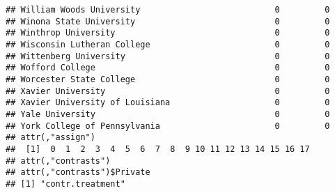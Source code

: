 \documentclass[
]{article}
\newenvironment{Shaded}{\begin{snugshade}}{\end{snugshade}}
\newcommand{\CommentTok}[1]{\textcolor[rgb]{0.56,0.35,0.01}{\textit{#1}}}
\newcommand{\DataTypeTok}[1]{\textcolor[rgb]{0.13,0.29,0.53}{#1}}
\newcommand{\DecValTok}[1]{\textcolor[rgb]{0.00,0.00,0.81}{#1}}
\newcommand{\FloatTok}[1]{\textcolor[rgb]{0.00,0.00,0.81}{#1}}
\newcommand{\KeywordTok}[1]{\textcolor[rgb]{0.13,0.29,0.53}{\textbf{#1}}}
\newcommand{\NormalTok}[1]{#1}
\newcommand{\OperatorTok}[1]{\textcolor[rgb]{0.81,0.36,0.00}{\textbf{#1}}}
\newcommand{\OtherTok}[1]{\textcolor[rgb]{0.56,0.35,0.01}{#1}}
\newcommand{\StringTok}[1]{\textcolor[rgb]{0.31,0.60,0.02}{#1}}
\begin{document}
\begin{verbatim}
## William Woods University                           0         0
## Winona State University                            0         0
## Winthrop University                                0         0
## Wisconsin Lutheran College                         0         0
## Wittenberg University                              0         0
## Wofford College                                    0         0
## Worcester State College                            0         0
## Xavier University                                  0         0
## Xavier University of Louisiana                     0         0
## Yale University                                    0         0
## York College of Pennsylvania                       0         0
## attr(,"assign")
##  [1]  0  1  2  3  4  5  6  7  8  9 10 11 12 13 14 15 16 17
## attr(,"contrasts")
## attr(,"contrasts")$Private
## [1] "contr.treatment"
\end{verbatim}

\begin{Shaded}
\end{Shaded}
\end{document}
